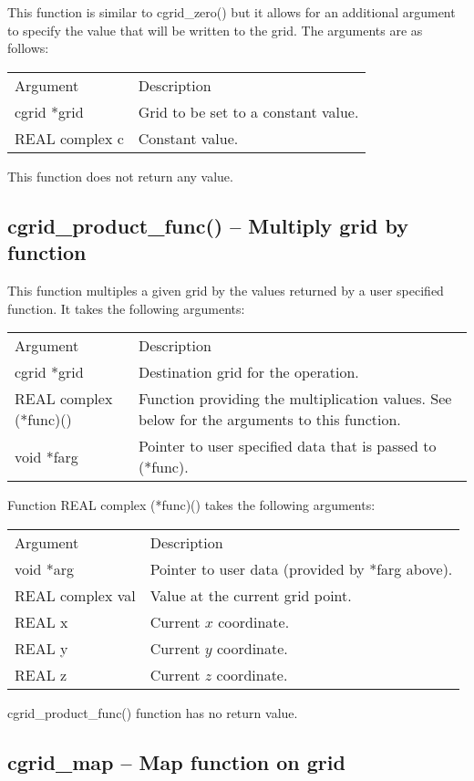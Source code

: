 \documentclass[12pt,letterpaper]{report}
\begin{document}
This function is similar to cgrid\_zero() but it allows for an additional argument to specify the value that will be written to the grid. The arguments are as follows:
\begin{longtable}{p{} p{}}
Argument & Description\\
\cline{1-2}
cgrid *grid & Grid to be set to a constant value.\\
REAL complex c & Constant value.\\
\end{longtable}
\noindent
This function does not return any value.

\subsection{cgrid\_product\_func() -- Multiply grid by function}

This function multiples a given grid by the values returned by a user specified function. It takes the following arguments:
\begin{longtable}{p{} p{}}
Argument & Description\\
\cline{1-2}
cgrid *grid & Destination grid for the operation.\\
REAL complex (*func)() & Function providing the multiplication values. See below for the arguments to this function.\\
void *farg & Pointer to user specified data that is passed to (*func).\\   
\end{longtable}
\noindent
Function REAL complex (*func)() takes the following arguments:
\begin{longtable}{p{} p{}}
Argument & Description\\
\cline{1-2}
void *arg & Pointer to user data (provided by *farg above).\\
REAL complex val & Value at the current grid point.\\
REAL x & Current $x$ coordinate.\\
REAL y & Current $y$ coordinate.\\
REAL z & Current $z$ coordinate.\\
\end{longtable}
\noindent
cgrid\_product\_func() function has no return value.

\subsection{cgrid\_map -- Map function on grid}
\end{document}

